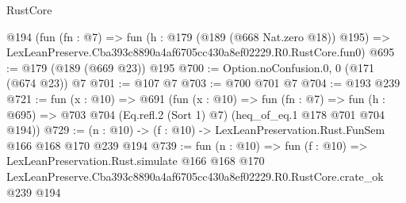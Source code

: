 \begin{lexlean}{RustCore}
\begin{coremodule}
    @194
    (fun (fn : @7) =>
    fun (h : @179 (@189 (@668 Nat.zero @18)) @195) =>
    LexLeanPreserve.Cba393c8890a4af6705cc430a8ef02229.R0.RustCore.fun0)
@695 := @179 (@189 (@669 @23)) @195
@700 := Option.noConfusion.{0, 0} (@171 (@674 @23)) @7
@701 := @107 @7
@703 := @700 @701 @7
@704 := @193 @239
@721 := fun (x : @10) =>
  @691
    (fun (x : @10) =>
    fun (fn : @7) =>
    fun (h : @695) => @703 @704 (Eq.refl.{2} (Sort 1) @7) (heq_of_eq.{1} @178 @701 @704 @194))
@729 := (n : @10) -> (f : @10) -> LexLeanPreservation.Rust.FunSem @166 @168 @170 @239 @194
@739 := fun (n : @10) =>
  fun (f : @10) =>
  LexLeanPreservation.Rust.simulate
    @166
    @168
    @170
    LexLeanPreserve.Cba393c8890a4af6705cc430a8ef02229.R0.RustCore.crate_ok
    @239
    @194
\end{coremodule}
\end{lexlean}
